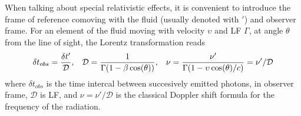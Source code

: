 When talking about special relativistic effects, it is convenient 
to introduce the frame of reference comoving with the fluid (usually denoted with $'$) 
and observer frame. 
For an element of the fluid moving with velocity $\upsilon$ and \ac{LF} 
$\Gamma$, at angle $\theta$ from the line of sight, the Lorentz transformation 
reads 
%
\begin{equation}
\delta t_{obs} = \frac{\delta t'}{\mathcal{D}}, \hspace{3mm}
\mathcal{D} = \frac{1}{\Gamma(1 - \beta\cos(\theta))}, \hspace{3mm}
\nu = \frac{\nu'}{\Gamma (1 - \upsilon\cos(\theta)/c)} = \nu' / \mathcal{D}
\label{eq:afterglow:dop_fac}
\end{equation}
%
where $\delta t_{obs}$ is the time intercal between succesively emitted photons, 
in observer frame, $\mathcal{D}$ is \ac{LF}, and $\nu=\nu'/\mathcal{D}$ is the 
classical Doppler shift formula for the frequency of the radiation.

%
%
%
%

